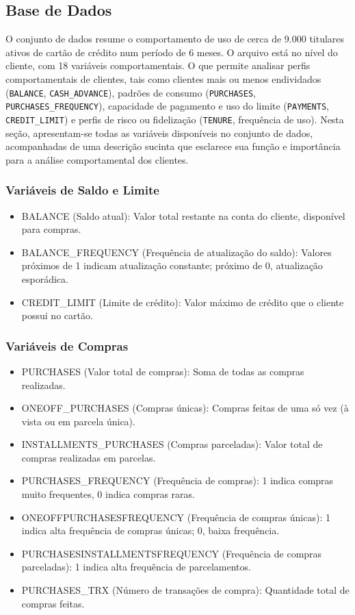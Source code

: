 \documentclass[12pt]{article}
\begin{document}
\subsection{Base de Dados}

\hspace{1.2cm}O conjunto de dados resume o comportamento de uso de cerca de 9.000 titulares ativos de cartão de crédito num período de 6 meses. O arquivo está no nível do cliente, com 18 variáveis comportamentais. O que permite analisar perfis comportamentais de clientes, tais como clientes mais ou menos endividados (\texttt{BALANCE}, \texttt{CASH\_ADVANCE}), padrões de consumo (\texttt{PURCHASES}, \texttt{PURCHASES\_FREQUENCY}), capacidade de pagamento e uso do limite (\texttt{PAYMENTS}, \texttt{CREDIT\_LIMIT}) e perfis de risco ou fidelização (\texttt{TENURE}, frequência de uso). Nesta seção, apresentam-se todas as variáveis disponíveis no conjunto de dados, acompanhadas de uma descrição sucinta que esclarece sua função e importância para a análise comportamental dos clientes.

\subsubsection{Variáveis de Saldo e Limite}
\begin{itemize}
    \item BALANCE (Saldo atual): Valor total restante na conta do cliente, disponível para compras.
    \item BALANCE\_FREQUENCY (Frequência de atualização do saldo): Valores próximos de 1 indicam atualização constante; próximo de 0, atualização esporádica.
    \item CREDIT\_LIMIT (Limite de crédito): Valor máximo de crédito que o cliente possui no cartão.
\end{itemize}

\subsubsection{Variáveis de Compras}
\begin{itemize}
    \item PURCHASES (Valor total de compras): Soma de todas as compras realizadas.
    \item ONEOFF\_PURCHASES (Compras únicas): Compras feitas de uma só vez (à vista ou em parcela única).
    \item INSTALLMENTS\_PURCHASES (Compras parceladas): Valor total de compras realizadas em parcelas.
    \item PURCHASES\_FREQUENCY (Frequência de compras): 1 indica compras muito frequentes, 0 indica compras raras.
    \item ONEOFFPURCHASESFREQUENCY (Frequência de compras únicas): 1 indica alta frequência de compras únicas; 0, baixa frequência.
    \item PURCHASESINSTALLMENTSFREQUENCY (Frequência de compras parceladas): 1 indica alta frequência de parcelamentos.
    \item PURCHASES\_TRX (Número de transações de compra): Quantidade total de compras feitas.
\end{itemize}
\end{document}
